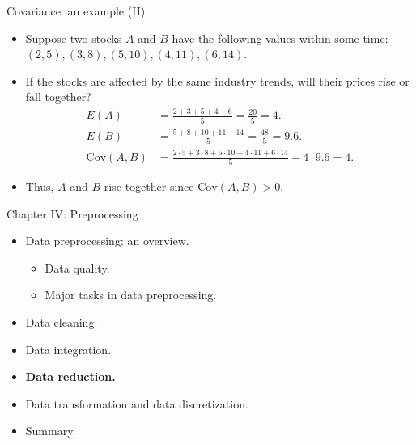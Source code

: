 \documentclass[aspectratio=169,t]{beamer}
\begin{document}
  { 
    \begin{frame}{Covariance: an example (II)}
    \begin{itemize}
      \item Suppose two stocks $A$ and $B$ have the following values within some time:\\
      $(2,5), (3,8), (5,10), (4,11), (6,14).$
      \item If the stocks are affected by the same industry trends, will their prices rise or fall together?
      \begin{align}
        E(A) &= \frac{2+3+5+4+6}{5} = \frac{20}{5} = 4.\\
        E(B) &= \frac{5+8+10+11+14}{5} = \frac{48}{5} = 9.6.\\
        \text{Cov}(A,B) &= \frac{2\cdot5 + 3\cdot 8 + 5 \cdot 10 + 4 \cdot 11 + 6 \cdot 14}{5} - 4\cdot 9.6 = 4.
      \end{align}
      \item Thus, $A$ and $B$ rise together since $\text{Cov}(A,B) > 0$.
    \end{itemize}
    \end{frame}
  }

  { 
    \begin{frame}{Chapter IV: Preprocessing}
        \begin{itemize}
            \item Data preprocessing: an overview.
            \begin{itemize}
              \item Data quality.
              \item Major tasks in data preprocessing.
            \end{itemize}
            \item Data cleaning.
            \item Data integration.
            \item \textbf{Data reduction.}
            \item Data transformation and data discretization.
            \item Summary.
        \end{itemize}
    \end{frame}
  }
\end{document}
